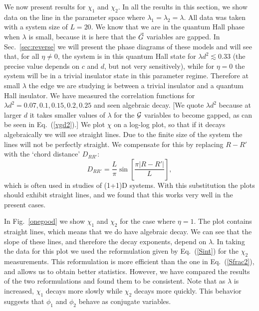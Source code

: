 We now present results for $\chi_1$ and $\chi_2$. In all the results in this section, we show data on the line in the parameter space where $\lambda_1=\lambda_2=\lambda$. All data was taken with a system size of $L=20$.  We know that we are in the quantum Hall phase when $\lambda$ is small, because it is here that the $\vec{G}$ variables are gapped. In Sec.~\ref{sec:reverse} we will present the phase diagrams of these models and will see that, for all $\eta \neq 0$, the system is in this quantum Hall state for $\lambda d^2\lesssim 0.33$ (the precise value depends on $c$ and $d$, but not very sensitively), while for $\eta=0$ the system will be in a trivial insulator state in this parameter regime.  Therefore at small $\lambda$ the edge we are studying is between a trivial insulator and a quantum Hall insulator. We have measured the correlation functions for $\lambda d^2=0.07,0.1,0.15,0.2,0.25$ and seen algebraic decay.  [We quote $\lambda d^2$ because at larger $d$ it takes smaller values of $\lambda$ for the $\cal{G}$ variables to become gapped, as can be seen in Eq.~(\ref{vgd2}).]  We plot $\chi$ on a log-log plot, so that if it decays algebraically we will see straight lines.  Due to the finite size of the system the lines will not be perfectly straight. We compensate for this by replacing $R-R'$ with the `chord distance' $D_{RR'}$:
\begin{equation}
D_{RR'}=\frac{L}{\pi}\sin\left[\frac{\pi |R-R'|}{L}\right],
\label{cordlength}
\end{equation}
which is often used in studies of (1+1)D systems.
With this substitution the plots should exhibit straight lines, and we found that this works very well in the present cases.

In Fig.~\ref{onegood} we show $\chi_1$ and $\chi_2$ for the case where $\eta=1$. The plot contains straight lines, which means that we do have algebraic decay. We can see that the slope of these lines, and therefore the decay exponents, depend on $\lambda$. In taking the data for this plot we used the reformulation given by Eq.~(\ref{Sint}) for the $\chi_2$ measurements. This reformulation is more efficient than the one in Eq.~(\ref{Sfrac2}), and allows us to obtain better statistics. However, we have compared the results of the two reformulations and found them to be consistent. Note that as $\lambda$ is increased, $\chi_1$ decays more slowly while $\chi_2$ decays more quickly. This behavior suggests that $\phi_1$ and $\phi_2$ behave as conjugate variables.

